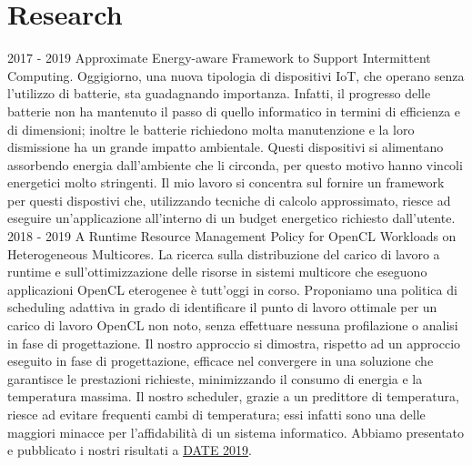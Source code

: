 \documentclass[letterpaper]{twentysecondcvit} %
\begin{document}
\section{Research}
\begin{twenty}
    \twentyitem
        {2017 - 2019}
        {}
        {Approximate Energy-aware Framework to Support Intermittent Computing.}
        {}
        {
        Oggigiorno, una nuova tipologia di dispositivi IoT, che operano senza l'utilizzo di batterie, sta guadagnando importanza. Infatti, il progresso delle batterie non ha mantenuto il passo di quello informatico in termini di efficienza e di dimensioni; inoltre le batterie richiedono molta manutenzione e la loro dismissione ha un grande impatto ambientale. Questi dispositivi si alimentano assorbendo energia dall'ambiente che li circonda, per questo motivo hanno vincoli energetici molto stringenti. Il mio lavoro si concentra sul fornire un framework per questi dispostivi che, utilizzando tecniche di calcolo approssimato, riesce ad eseguire un'applicazione all'interno di un budget energetico richiesto dall'utente.
        {
        }
        }
        {\footnotesize{}}
        \\
    \twentyitem
        {2018 - 2019}
        {}
        {A Runtime Resource Management Policy for OpenCL Workloads on Heterogeneous Multicores.}
        {}
        {
       La ricerca sulla distribuzione del carico di lavoro a runtime e sull’ottimizzazione delle risorse in sistemi multicore che eseguono applicazioni OpenCL eterogenee è tutt'oggi in corso. Proponiamo una politica di scheduling adattiva in grado di identificare il punto di lavoro ottimale per un carico di lavoro OpenCL non noto, senza effettuare nessuna profilazione o analisi in fase di progettazione. Il nostro approccio si dimostra, rispetto ad un approccio eseguito in fase di progettazione, efficace nel convergere in una soluzione che garantisce le prestazioni richieste, minimizzando il consumo di energia e la temperatura massima. Il nostro scheduler, grazie a un predittore di temperatura, riesce ad evitare frequenti cambi di temperatura; essi infatti sono una delle maggiori minacce per l'affidabilità di un sistema informatico. Abbiamo presentato e pubblicato i nostri risultati a \href{https://past.date-conference.com}{DATE 2019}.
        {
        }
        }
        {\footnotesize{}}

\end{twenty}
\end{document}

